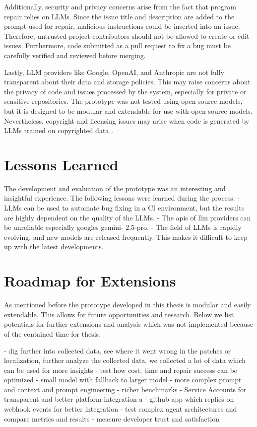 Additionally, security and privacy concerns arise from the fact that program repair relies on LLMs. Since the issue title and description are added to the prompt used for repair, malicious instructions could be inserted into an issue. Therefore, untrusted project contributors should not be allowed to create or edit issues. Furthermore, code submitted as a pull request to fix a bug must be carefully verified and reviewed before merging.

Lastly, LLM providers like Google, OpenAI, and Anthropic are not fully transparent about their data and storage policies. This may raise concerns about the privacy of code and issues processed by the system, especially for private or sensitive repositories. The prototype was not tested using open source models, but it is designed to be modular and extendable for use with open source models. Nevertheless, copyright and licensing issues may arise when code is generated by LLMs trained on copyrighted data \cite{sauvolaFutureSoftwareDevelopment2024, houLargeLanguageModels2024}.

\section{Lessons Learned}
The development and evaluation of the prototype was an interesting and insightful experience. The following lessons were learned during the process:
- LLMs can be used to automate bug fixing in a CI environment, but the results are highly dependent on the quality of the LLMs.
- The apis of llm providers can be unreliable especially googles gemini- 2.5-pro.
- The field of LLMs is rapidly evolving, and new models are released frequently. This makes it difficult to keep up with the latest developments.


\section{Roadmap for Extensions} \label{section:roadmap}
As mentioned before the prototype developed in this thesis is modular and easily extendable. This allows for future opportunities and research. Below we list potentials for further extensions and analysis which was not implemented because of the contained time for thesis.

- dig further into collected data, see where it went wrong in the patches or localization, further analyze the collected data, we collected a lot of data which can be used for more insights
- test how cost, time and repair success can be optimized
- small model with fallback to larger model
- more complex prompt and context and prompt engineering
- richer benchmarks
- Service Accounts for transparent and better platform integration a
- github app which replies on webhook events for better integration
- test complex agent architectures and compare metrics and results
- measure developer trust and satisfaction
